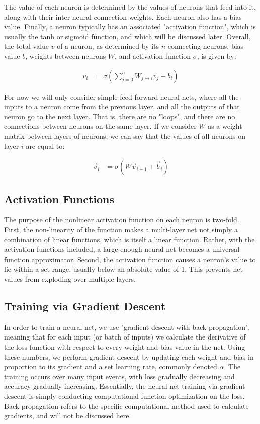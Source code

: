 The value of each neuron is determined by the values of neurons that feed into it, along with their inter-neural connection weights. Each neuron also has a bias value. Finally, a neuron typically has an associated "activation function", which is usually the tanh or sigmoid function, and which will be discussed later. Overall, the total value $v$ of a neuron, as determined by its $n$ connecting neurons, bias value $b$, weights between neurons $W$, and activation function $\sigma$, is given by:

\begin{align}
    v_i &= \sigma \left( \sum_{j=0}^n W_{j\rightarrow i} v_j + b_i \right)
\end{align}

For now we will only consider simple feed-forward neural nets, where all the inputs to a neuron come from the previous layer, and all the outputs of that neuron go to the next layer. That is, there are no "loops", and there are no connections between neurons on the same layer. If we consider $W$ as a weight matrix between layers of neurons, we can say that the values of all neurons on layer $i$ are equal to:

\begin{align}
    \Vec{v}_i &= \sigma(W \Vec{v}_{i-1} + \Vec{b}_i)
\end{align}

\subsection*{Activation Functions}

The purpose of the nonlinear activation function on each neuron is two-fold. First, the non-linearity of the function makes a multi-layer net not simply a combination of linear functions, which is itself a linear function. Rather, with the activation functions included, a large enough neural net becomes a universal function approximator. Second, the activation function causes a neuron's value to lie within a set range, usually below an absolute value of 1. This prevents net values from exploding over multiple layers.

\subsection*{Training via Gradient Descent}

In order to train a neural net, we use "gradient descent with back-propagation", meaning that for each input (or batch of inputs) we calculate the derivative of the loss function with respect to every weight and bias value in the net. Using these numbers, we perform gradient descent by updating each weight and bias in proportion to its gradient and a set learning rate, commonly denoted $\alpha$. The training occurs over many input events, with loss gradually decreasing and accuracy gradually increasing. Essentially, the neural net training via gradient descent is simply conducting computational function optimization on the loss. Back-propagation refers to the specific computational method used to calculate gradients, and will not be discussed here.

